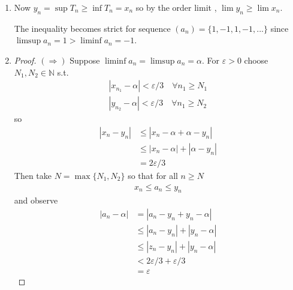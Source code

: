 \begin{enumerate}[label=(\alph*)]
\begin{proof}
        Since $(x_n)$ is monotonic and bounded below, by the
         Monotone convergence \Thm $(x_n)$ converges.
    \end{proof}

    \item 
    Now $y_n = \sup T_n \geq \inf T_n = x_n$ so by the order limit \Thm, 
    $\lim y_n \geq \lim x_n$.

    The inequality becomes strict for sequence $(a_n) = \{ 1,-1,1,-1,... \}$ 
    since $\limsup a_n = 1 > \liminf a_n = -1$.

    \item 
    \begin{proof}
        $(\Rightarrow)$ Suppose $\liminf a_n = \limsup a_n = \alpha$. 
        For $\varepsilon > 0$ choose $N_1, N_2 \in \mathbb{N}$
        s.t. 
        \begin{gather*}
            |x_{n_1} - \alpha| < \varepsilon/3 \quad \forall n_1 \geq N_1\\
            |y_{n_2} - \alpha| < \varepsilon/3 \quad \forall n_1 \geq N_2
        \end{gather*}
        so
        \begin{align*}
            |x_n - y_n| &\leq |x_n - \alpha + \alpha - y_n| \\
            &\leq |x_n - \alpha| + |\alpha - y_n| \\
            &= 2\varepsilon/3
        \end{align*}
        Then take $N = \max\{ N_1, N_2 \}$ so that for all $n \geq N$
        \begin{align*}
            x_n \leq a_n \leq y_n
        \end{align*}
        and observe
        \begin{align*}
            |a_n - \alpha| &= |a_n - y_n + y_n - \alpha| \\
                            &\leq |a_n - y_n| + |y_n - \alpha| \\
                            &\leq |z_n - y_n| + |y_n - \alpha| \\
                            &< 2\varepsilon/3 + \varepsilon/3 \\
                            &= \varepsilon
        \end{align*}


\end{proof}
\end{enumerate}
